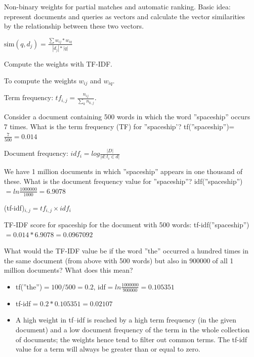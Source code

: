 \begin{breakbox}

Non-binary weights for partial matches and automatic ranking. Basic idea: represent documents and queries as vectors and calculate the vector similarities by the relationship between these two vectors. 

\begin{center}
	$\text{sim}(q, d_j) = \frac{\sum w_{ij}*w_{iq}}{|d_j| * |q|}$
\end{center}
Compute the weights with TF-IDF.
\end{breakbox}

\begin{breakbox}

To compute the weights $w_{ij}$ and $w_{iq}$.

\begin{center}
	Term frequency: $tf_{i,j} = \frac{n_{ij}}{\sum_{k}{} n_{k,j}}$. 
\end{center}

Consider a document containing 500 words in which the word ''spaceship'' occurs 7 times. What is the term frequency (TF) for ''spaceship'? tf(''spaceship'')=$\frac{7}{500} = 0.014$

\begin{center}
	Document frequency: $idf_i = log \frac{|D|}{|{d:t_i \in d}|}$
\end{center}

We have 1 million documents in which ''spaceship'' appears in one thousand of these. What is the document frequency value for ''spaceship''? idf(''spaceship'')$=ln\frac{1000000}{1000}=6.9078$

\begin{center}
	(tf-idf)$_{i,j}	= tf_{i,j} \times idf_i$
\end{center}
TF-IDF score for spaceship for the document with 500 words: tf-idf(''spaceship'')$=0.014*6.9078=0.0967092$

What would the TF-IDF value be if the word ''the'' occurred a hundred times in the same document (from above with 500 words) but also in $900000$ of all 1 million documents? What does this mean?

\begin{itemize}
	\item tf(''the'')$=100/500=0.2$, idf$=ln\frac{1000000}{900000}=0.105351$
	\item tf-idf$=0.2*0.105351=0.02107$
	\item A high weight in tf–idf is reached by a high term frequency (in the given document) and a low document frequency of the term in the whole collection of documents; the weights
hence tend to filter out common terms. The tf-idf value for a term will always be greater than or equal to zero.
\end{itemize}
\end{breakbox}